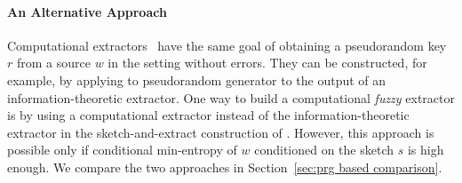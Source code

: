 \documentclass[11pt]{article}
\newcommand{\secref}[1]{\mbox{Section~\ref{#1}}}
\begin{document}
\paragraph{An Alternative Approach}  Computational extractors~\cite{krawczyk2010cryptographic, barak2011leftover, dachman2012computational} have the same goal of obtaining a pseudorandom key $r$ from a source $w$ in the setting without errors.  They can be constructed, for example, by applying to pseudorandom generator to the output of an information-theoretic extractor.  One way to build a computational \emph{fuzzy} extractor is by using a computational extractor instead  of the information-theoretic extractor in the sketch-and-extract construction of  \cite{DBLP:journals/siamcomp/DodisORS08}.   However, this approach is possible only if conditional min-entropy of $w$ conditioned on the sketch $s$ is high enough.  
We compare the two approaches in \secref{sec:prg based comparison}.
\end{document}

